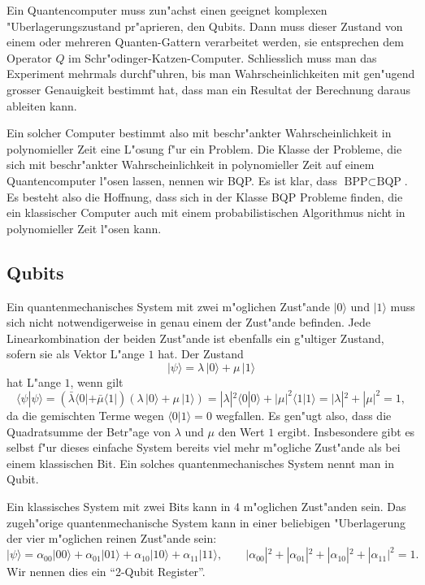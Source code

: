 Ein Quantencomputer muss zun"achst einen geeignet komplexen
"Uberlagerungszustand pr"aprieren, den Qubits. Dann muss dieser Zustand
von einem oder mehreren Quanten-Gattern verarbeitet werden, sie
entsprechen dem Operator $Q$ im Schr"odinger-Katzen-Computer.
Schliesslich muss man das Experiment mehrmals durchf"uhren, bis man
Wahrscheinlichkeiten mit gen"ugend grosser Genauigkeit bestimmt hat,
dass man ein Resultat der Berechnung daraus ableiten kann.

Ein solcher Computer bestimmt also mit beschr"ankter Wahrscheinlichkeit
in polynomieller Zeit eine L"osung f"ur ein Problem. Die
Klasse der Probleme, die sich mit beschr"ankter Wahrscheinlichkeit in
polynomieller Zeit auf einem Quantencomputer l"osen lassen, nennen wir
BQP.
Es ist klar, dass $\text{BPP}\subset\text{BQP}$.
Es besteht also die Hoffnung, dass sich in der Klasse BQP Probleme finden,
die ein klassischer Computer auch mit einem probabilistischen Algorithmus
nicht in polynomieller Zeit l"osen kann.

\subsection{Qubits}
Ein quantenmechanisches System mit zwei m"oglichen Zust"ande $|0\rangle$
und $|1\rangle$ muss sich nicht
notwendigerweise in genau einem der Zust"ande befinden.
Jede Linearkombination der beiden Zust"ande ist ebenfalls ein g"ultiger
Zustand, sofern sie als Vektor L"ange $1$ hat.
Der Zustand
\[
|\psi\rangle
=
\lambda \,|0\rangle + \mu\,|1\rangle
\]
hat L"ange $1$, wenn gilt
\[
\langle\psi|\psi\rangle
=
(
\bar\lambda
\langle 0|
+
\bar\mu
\langle 1|
)
(
\lambda \,|0\rangle + \mu\,|1\rangle
)
=
|\lambda|^2\langle 0|0\rangle + |\mu|^2\langle 1|1\rangle
=
|\lambda|^2+|\mu|^2
=
1
,
\]
da die gemischten Terme wegen $\langle 0|1\rangle=0$ wegfallen.
Es gen"ugt also, dass die Quadratsumme der Betr"age von $\lambda$ und $\mu$
den Wert $1$ ergibt.
Insbesondere gibt es selbst f"ur dieses einfache System bereits viel
mehr m"ogliche Zust"ande als bei einem klassischen Bit.
Ein solches quantenmechanisches System nennt man in Qubit.

Ein klassisches System mit zwei Bits kann in 4 m"oglichen Zust"anden sein.
Das zugeh"orige quantenmechanische System kann in einer beliebigen
"Uberlagerung der vier m"oglichen reinen Zust"ande sein:
\[
|\psi\rangle
=
\alpha_{00}|00\rangle
+
\alpha_{01}|01\rangle
+
\alpha_{10}|10\rangle
+
\alpha_{11}|11\rangle
,\qquad
|\alpha_{00}|^2
+
|\alpha_{01}|^2
+
|\alpha_{10}|^2
+
|\alpha_{11}|^2
=1.
\]
Wir nennen dies ein ``2-Qubit Register''.

